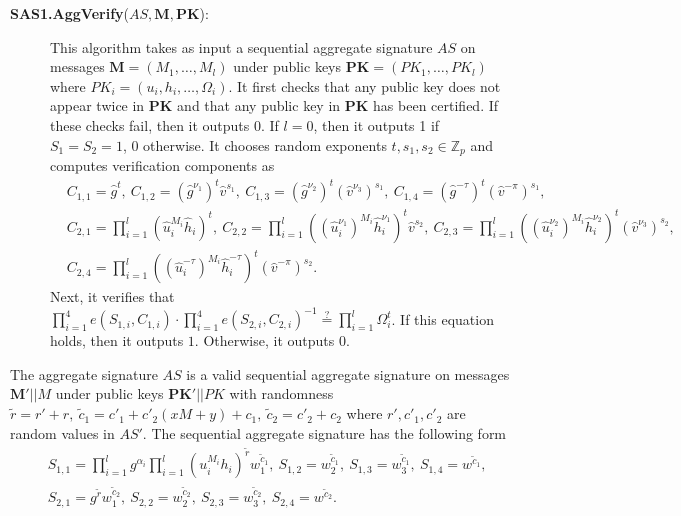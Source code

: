 \documentclass[11pt,letterpaper]{article}
\newcommand{\vect}[1]{\mathbf{#1}}
\newcommand{\Z}{\mathbb{Z}}
\begin{document}
\begin{description}
\item [\textbf{SAS1.AggVerify}($AS, \vect{M}, \vect{PK}$):] This algorithm
    takes as input a sequential aggregate signature $AS$ on messages
    $\vect{M} = (M_1, \ldots, M_l)$ under public keys $\vect{PK} = (PK_1,
    \ldots, PK_l)$ where $PK_i = (u_i, h_i, \ldots, \Omega_i)$. It first
    checks that any public key does not appear twice in $\vect{PK}$ and
    that any public key in $\vect{PK}$ has been certified. If these checks
    fail, then it outputs 0. If $l=0$, then it outputs 1 if $S_1 = S_2 =
    1$, 0 otherwise. It chooses random exponents $t, s_1, s_2 \in \Z_p$ and
    computes verification components as
    \begin{align*}
    &   C_{1,1} = \hat{g}^t,~
        C_{1,2} = (\hat{g}^{\nu_1})^t \hat{v}^{s_1},~
        C_{1,3} = (\hat{g}^{\nu_2})^t (\hat{v}^{\nu_3})^{s_1},~
        C_{1,4} = (\hat{g}^{-\tau})^t (\hat{v}^{-\pi})^{s_1}, \\
    &   C_{2,1} = \prod_{i=1}^l (\hat{u}_i^{M_i} \hat{h}_i)^t,~
        C_{2,2} = \prod_{i=1}^l ((\hat{u}_i^{\nu_1})^{M_i} \hat{h}_i^{\nu_1})^t
                  \hat{v}^{s_2},~
        C_{2,3} = \prod_{i=1}^l ((\hat{u}_i^{\nu_2})^{M_i} \hat{h}_i^{\nu_2})^t
                  (\hat{v}^{\nu_3})^{s_2},~ \\
    &   C_{2,4} = \prod_{i=1}^l ((\hat{u}_i^{-\tau})^{M_i} \hat{h}_i^{-\tau})^t
                  (\hat{v}^{-\pi})^{s_2}.
    \end{align*}
    Next, it verifies that $\prod_{i=1}^4 e(S_{1,i}, C_{1,i}) \cdot
    \prod_{i=1}^4 e(S_{2,i}, C_{2,i})^{-1} \stackrel{?}{=} \prod_{i=1}^l
    \Omega_i^t$. If this equation holds, then it outputs $1$. Otherwise, it
    outputs $0$.
\end{description}

The aggregate signature $AS$ is a valid sequential aggregate signature on
messages $\vect{M}'||M$ under public keys $\vect{PK}'||PK$ with randomness
    $\tilde{r} = r' + r,~
    \tilde{c}_1 = c'_1 + c'_2(xM + y) + c_1,~
    \tilde{c}_2 = c'_2 + c_2$
where $r', c'_1, c'_2$ are random values in $AS'$. The sequential aggregate
signature has the following form
    \begin{align*}
    &   S_{1,1} = \prod_{i=1}^l g^{\alpha_i} \prod_{i=1}^l (u_i^{M_i} h_i)^{\tilde{r}}
                  w_1^{\tilde{c}_1},~
        S_{1,2} = w_2^{\tilde{c}_1},~
        S_{1,3} = w_3^{\tilde{c}_1},~
        S_{1,4} = w^{\tilde{c}_1}, \\
    &   S_{2,1} = g^{\tilde{r}} w_1^{\tilde{c}_2},~
        S_{2,2} = w_2^{\tilde{c}_2},~
        S_{2,3} = w_3^{\tilde{c}_2},~
        S_{2,4} = w^{\tilde{c}_2}.
    \end{align*}
\end{document}
